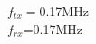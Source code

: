 \documentclass[preview]{standalone}
\begin{document}
\begin{center}
$f_{tx}=$0.17MHz\\$f_{rx}$=0.17MHz
\end{center}
\end{document}
